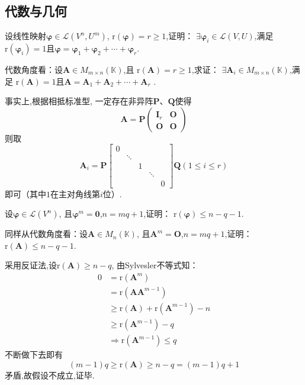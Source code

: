 \subsection{代数与几何}
\begin{brown}
\begin{example}
    设线性映射$\bm{\varphi}\in \mathcal{L}\left(V^n,U^m\right)$,
    $\mathrm{r}\left(\bm{\varphi}\right)=r\geqslant 1$,证明：
    $\exists \bm{\varphi}_i\in \mathcal{L}\left(V,U\right)$,满足
    $\mathrm{r}\left(\bm{\varphi}_i\right)=1$且$\bm{\varphi}=\bm{\varphi}_1+\bm{\varphi}_2+\cdots+\bm{\varphi}_r$.
\end{example}
\begin{Proof}
代数角度看：设$\bm{A}\in M_{m\times n}\left(\mathbb{K}\right)$,且
$\mathrm{r}\left(\bm{A}\right)=r\geqslant 1$,求证：
$\exists \bm{A}_i\in M_{m\times n}\left(\mathbb{K}\right)$,满足
$\mathrm{r}\left(\bm{A}\right)=1$且$\bm{A}=\bm{A}_1+\bm{A}_2+\cdots+\bm{A}_r$
.

事实上,根据相抵标准型,
一定存在非异阵$\bm{P}$、$\bm{Q}$使得
\[
\bm{A}=\bm{P}\begin{pmatrix}
    \bm{I}_r&\bm{O}\\
    \bm{O}&\bm{O}
\end{pmatrix}
\]
则取
\[
\bm{A}_i=\bm{P}\begin{bmatrix}
0&&&&\\
&\ddots&&&\\
&&1&&\\
&&&\ddots&\\
&&&&0
\end{bmatrix}\bm{Q}\left(1\leqslant i \leqslant r\right)
\]
即可（其中$1$在主对角线第$i$位）.
\end{Proof}
\end{brown}
\begin{brown}
\begin{example}
    设$\bm{\varphi}\in \mathcal{L}\left(V^n\right)$,
    且$\bm{\varphi}^m=\bm{0}$,$n=mq+1$,证明：
    $\mathrm{r}\left(\bm{\varphi}\right)\leqslant n - q - 1$.
\end{example}
\begin{Proof}
同样从代数角度看：设$\bm{A}\in M_{n}\left(\mathbb{K}\right)$,
且$\bm{A}^m=\bm{O}$,$n=mq+1$,证明：
$\mathrm{r}\left(\bm{A}\right)\leqslant n-q-1.$

采用反证法,设$\mathrm{r}\left(\bm{A}\right)\geqslant n-q$,
由Sylvesler不等式知：
\begin{align*}
    0&=\mathrm{r}\left(\bm{A}^m\right)\\
    &=\mathrm{r}\left(\bm{AA}^{m-1}\right)\\
    &\geqslant \mathrm{r}\left(\bm{A}\right)+\mathrm{r}
    \left(\bm{A}^{m-1}\right)-n\\
    &\geqslant \mathrm{r}\left(\bm{A}^{m-1}\right)-q\\
    &\Longrightarrow \mathrm{r}\left(\bm{A}^{m-1}\right)
    \leqslant q
\end{align*}
不断做下去即有\[
\left(m-1\right)q\geqslant \mathrm{r}\left(\bm{A}\right)\geqslant n-q = \left(m-1\right)q+1
\]
矛盾,故假设不成立,证毕.
\end{Proof}
\end{brown}
